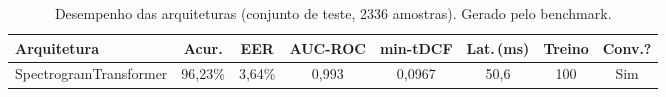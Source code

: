 \begin{table}[H]
\centering
\caption{Desempenho das arquiteturas (conjunto de teste, 2336 amostras). Gerado pelo benchmark.}
\label{tab:bench_resultados}
\small\singlespacing
\begin{tabular}{lccccccc}
\toprule
\textbf{Arquitetura} & \textbf{Acur.} & \textbf{EER} & \textbf{AUC-ROC} & \textbf{min-tDCF} & \textbf{Lat.\,(ms)} & \textbf{Treino} & \textbf{Conv.?} \\
\midrule
SpectrogramTransformer & 96,23\% & 3,64\% & 0,993 & 0,0967 & 50,6 & 100 & \textcolor{successgreen}{Sim} \\
\bottomrule
\end{tabular}
\end{table}

